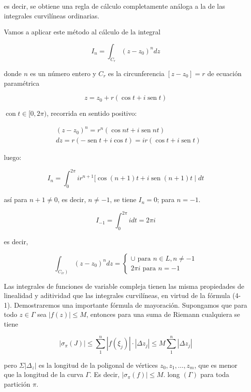 \documentclass[10pt]{article}
\theoremstyle{plain}
\theoremstyle{definition}
\theoremstyle{remark}
\begin{document}
es decir, se obtiene una regla de cálculo completamente análoga a la de las integrales curvilíneas ordinarias.

Vamos a aplicar este método al cálculo de la integral

$$
I_{n}=\int_{C_{r}}\left(z-z_{0}\right)^{n} d z
$$

donde $n$ es un número entero y $C_{r}$ es la circunferencia $\left[z-z_{0}\right]=r$ de ecuación paramétrica

$$
z=z_{0}+r(\cos t+i \operatorname{sen} t)
$$

$\operatorname{con} t \in[0,2 \pi)$, recorrida en sentido positivo:

$$
\begin{aligned}
& \left(z-z_{0}\right)^{n}=r^{n}(\cos n t+i \operatorname{sen} n t) \\
& d z=r(-\operatorname{sen} t+i \cos t)=i r(\cos t+i \operatorname{sen} t)
\end{aligned}
$$

luego:

$$
I_{n}=\int_{0}^{2 \pi} i r^{n+1}[\cos (n+1) t+i \operatorname{sen}(n+1) t \mid d t
$$

así para $n+1 \neq 0$, es decir, $n \neq-1$, se tiene $I_{n}=0$; para $n=-1$.

$$
I_{-1}=\int_{0}^{2 \pi} i d t=2 \pi i
$$

es decir,

\[
\int_{\left.C_{i r}\right)}\left(z-z_{0}\right)^{n} d z=\left\{\begin{array}{l}
\cup \text { para } n \in L, n \neq-1  \tag{4-2}\\
2 \pi i \text { para } n=-1
\end{array}\right.
\]

Las integrales de funciones de variable compleja tienen las misma propiedades de linealidad y aditividad que las integrales curvilíneas, en virtud de la fórmula (4-1). Demostraremos una importante fórmula de mayoración. Supongamos que para todo $z \in \Gamma$ sea $|f(z)| \leqslant M$, entonces para una suma de Riemann cualquiera se tiene

$$
\left|\sigma_{\pi}(J)\right| \leqslant \sum_{1}^{n}\left|f\left(\xi_{j}\right)\right| \cdot\left|\Delta z_{j}\right| \leqslant M \sum_{1}^{n}\left|\Delta z_{j}\right|
$$

pero $\Sigma\left|\Delta_{z}\right|$ es la longitud de la poligonal de vértices $z_{0}, z_{1}, \ldots, z_{m}$, que es menor que la longitud de la curva $\Gamma$. Es decir, $\left|\sigma_{\pi}(f)\right| \leqslant M$. long $(\Gamma)$ para toda partición $\pi$.
\end{document}
